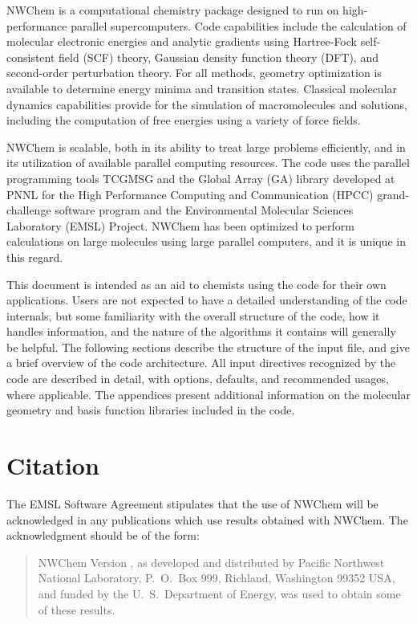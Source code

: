 %
%
\label{sec:intro}

NWChem is a computational chemistry package designed to run on
high-performance parallel supercomputers.
Code capabilities include the calculation of molecular electronic
energies and analytic gradients using Hartree-Fock self-consistent field (SCF) theory, Gaussian
density function theory (DFT), and second-order perturbation theory.
For all methods, geometry optimization is available to determine energy minima and transition states.
Classical molecular dynamics capabilities
provide for the simulation of macromolecules and solutions, including
the computation of free energies using a variety of force fields.

NWChem is scalable, both in its ability to treat large problems
efficiently, and in its utilization of available parallel computing
resources.  The code uses the parallel programming tools TCGMSG and
the Global Array (GA) library developed at PNNL for the High Performance
Computing and Communication (HPCC) grand-challenge
software program and the Environmental Molecular Sciences Laboratory
(EMSL) Project.  NWChem has been optimized to perform calculations on
large molecules using large parallel computers, and it is unique in
this regard.  

This document is intended as an aid to chemists using the code for
their own applications.  Users are not expected to have a detailed
understanding of the code internals, but some familiarity with the
overall structure of the code, how it handles information, and the
nature of the algorithms it contains will generally be helpful.  The
following sections describe the structure of the input file, and give
a brief overview of the code architecture.  All input directives
recognized by the code are described in detail, with options,
defaults, and recommended usages, where applicable.  The appendices
present additional information on the molecular geometry and basis
function libraries included in the code.

\section{Citation}

The EMSL Software Agreement stipulates that the use of NWChem will be
acknowledged in any publications which use results obtained with
NWChem.  The acknowledgment should be of the form:
\begin{quote}

  NWChem Version \nwchemversion, as developed and distributed by
  Pacific Northwest National Laboratory, P.~O.~Box 999, Richland,
  Washington 99352 USA, and funded by the U.~S.~Department of Energy,
  was used to obtain some of these results.
\end{quote}


